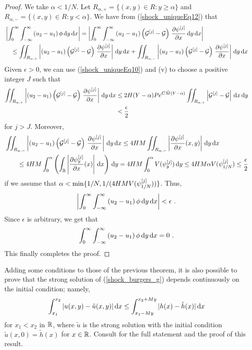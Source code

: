 \begin{proof}
We take $\alpha < 1/N$.  Let
$R_{\alpha,+} = \{ (x,y) \in R : y \geq \alpha \}$ and
$R_{\alpha,-} = \{ (x,y) \in R : y < \alpha \}$.  We have from
(\ref{shock_uniqueEq12}) that
\begin{align*}
&\left| \int_0^\infty \int_{-\infty}^\infty
\left(u_2 - u_1 \right) \phi \,\mathrm{d}{y} \,\mathrm{d}{x} \right|
= \left|\int_0^\infty \int_{-\infty}^\infty
\left(u_2 - u_1 \right)\left({\cal G}^{[j]} - {\cal G}\right)
\,\frac{\partial{\psi^{[j]}}}{\partial x} \,\mathrm{d}{y} \,\mathrm{d}{x} \right| \\
&\quad \leq \iint_{R_{\alpha,+}} \left|
\left(u_2 - u_1 \right)\left({\cal G}^{[j]} - {\cal G}\right)
\,\frac{\partial{\psi^{[j]}}}{\partial x} \right| \,\mathrm{d}{y} \,\mathrm{d}{x}
+ \iint_{R_{\alpha,-}} \left|
\left(u_2 - u_1 \right)\left({\cal G}^{[j]} - {\cal G}\right)
\,\frac{\partial{\psi^{[j]}}}{\partial x} \right|\,\mathrm{d}{y} \,\mathrm{d}{x}
\end{align*}
Given $\epsilon>0$, we can use (\ref{shock_uniqueEq10}) and (v) to
choose a positive integer $J$ such that
\begin{align*}
\iint_{R_{\alpha,+}} \left|
\left(u_2 - u_1 \right)\left({\cal G}^{[j]} - {\cal G}\right)
\,\frac{\partial{\psi^{[j]}}}{\partial x} \right| \,\mathrm{d}{y} \,\mathrm{d}{x}
&\leq 2 H (Y-\alpha) P e^{C\tilde{M}(Y-\alpha)}
\iint_{R_{\alpha,+}} \left|{\cal G}^{[j]} - {\cal G}\right| \,\mathrm{d}{x}\,\mathrm{d}{y} \\
&< \frac{\epsilon}{2}
\end{align*}
for $j >J$.  Moreover,
\begin{align*}
&\iint_{R_{\alpha,-}} \left|
\left(u_2 - u_1 \right)\left({\cal G}^{[j]} - {\cal G}\right)
\,\frac{\partial{\psi^{[j]}}}{\partial x} \right|\,\mathrm{d}{y} \,\mathrm{d}{x}
\leq 4 H M \iint_{R_{\alpha,-}} \left|\frac{\partial{\psi^{[j]}}}{\partial x}(x,y)
\right|\,\mathrm{d}{y} \,\mathrm{d}{x} \\
&\qquad \leq 4 H M \int_0^\alpha \left(\int_{\mathbb{R}} \left|\frac{\partial{\psi^{[j]}_y}}{\partial x}(x)
\right|\,\mathrm{d}{x} \right)\,\mathrm{d}{y}
= 4 H M \int_0^\alpha V(\psi^{[j]}_y) \,\mathrm{d}{y}
\leq 4 H M \alpha V(\psi^{[j]}_{1/N}) \leq \frac{\epsilon}{2}
\end{align*}
if we assume that
$\displaystyle \alpha < \min \{1/N, 1/(4 H M V(\psi^{[j]}_{1/N})) \}$.
Thus,
\[
\left| \int_0^\infty \int_{-\infty}^\infty
\left(u_2 - u_1 \right) \phi \dx{y} \dx{x} \right| < \epsilon \ .
\]
Since $\epsilon$ is arbitrary, we get that
\[
\int_0^\infty \int_{-\infty}^\infty
\left(u_2 - u_1 \right) \phi \,\mathrm{d}{y} \,\mathrm{d}{x} = 0 \ .
\]
This finally completes the proof.
\end{proof}

Adding some conditions to those of the previous theorem, it is also
possible to prove that the strong solution of (\ref{shock_burgers_g}) 
depends continuously on the initial condition; namely,
\[
\int_{x_1}^{x_2} |u(x,y) - \tilde{u}(x,y)|\,\mathrm{d}{x} 
\leq \int_{x_1-My}^{x_2+My} |h(x) - \tilde{h}(x)|\,\mathrm{d}{x}
\]
for $x_1 < x_2$ in $\mathbb{R}$, where $\tilde{u}$ is the strong solution
with the initial condition $\tilde{u}(x,0) = \tilde{h}(x)$ for $x\in \mathbb{R}$.
Consult \cite{Smo} for the full statement and the proof of this
result.

